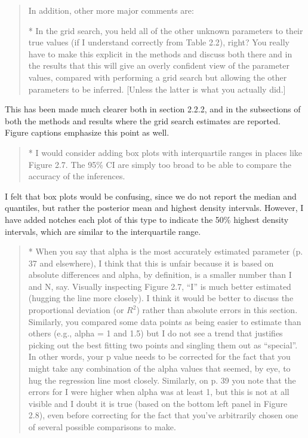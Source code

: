 \documentclass[12pt]{article}
\begin{document}
\begin{quote}
  \itshape
  
  In addition, other more major comments are:

  * In the grid search, you held all of the other unknown parameters to their
  true values (if I understand correctly from Table 2.2), right?  You really
  have to make this explicit in the methods and discuss both there and in the
  results that this will give an overly confident view of the parameter values,
  compared with performing a grid search but allowing the other parameters to
  be inferred.  [Unless the latter is what you actually did.]
\end{quote}

This has been made much clearer both in section 2.2.2, and in the subsections
of both the methods and results where the grid search estimates are reported.
Figure captions emphasize this point as well.

\begin{quote}
  \itshape
  
  * I would consider adding box plots with interquartile ranges in places like
  Figure 2.7.  The 95\% CI are simply too broad to be able to compare the
  accuracy of the inferences.
\end{quote}

I felt that box plots would be confusing, since we do not report the median and
quantiles, but rather the posterior mean and highest density intervals.
However, I have added notches each plot of this type to indicate the 50\%
highest density intervals, which are similar to the interquartile range.

\begin{quote}
  \itshape

  * When you say that alpha is the most accurately estimated parameter (p. 37
  and elsewhere), I think that this is unfair because it is based on absolute
  differences and alpha, by definition, is a smaller number than I and N, say.
  Visually inspecting Figure 2.7, ``I'' is much better estimated (hugging the
  line more closely).  I think it would be better to discuss the proportional
  deviation (or $R^2$)  rather than absolute errors in this section.  Similarly,
  you compared some data points as being easier to estimate than others (e.g.,
  alpha = 1 and 1.5) but I do not see a trend that justifies picking out the
  best fitting two points and singling them out as ``special''.  In other words,
  your p value needs to be corrected for the fact that you might take any
  combination of the alpha values that seemed, by eye, to hug the regression
  line most closely.  Similarly, on p. 39 you note that the errors for I were
  higher when alpha was at least 1, but this is not at all visible and I doubt
  it is true (based on the bottom left panel in Figure 2.8), even before
  correcting for the fact that you’ve arbitrarily chosen one of several
  possible comparisons to make.
\end{quote}
\end{document}

